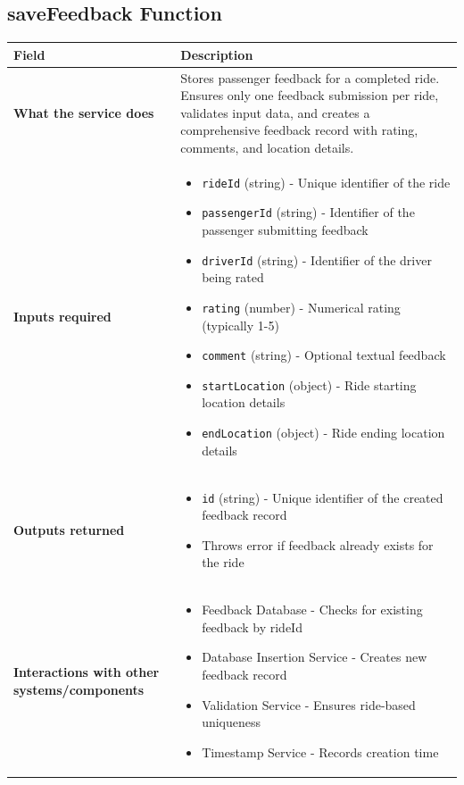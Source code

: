 \documentclass[11pt,a4paper]{article}
\begin{document}
\subsection{saveFeedback Function}

\begin{longtable}{|p{3cm}|p{12cm}|}
\hline
\textbf{Field} & \textbf{Description} \\
\hline
\textbf{What the service does} & 
Stores passenger feedback for a completed ride. Ensures only one feedback submission per ride, validates input data, and creates a comprehensive feedback record with rating, comments, and location details. \\
\hline
\textbf{Inputs required} & 
\begin{itemize}[nosep]
\item \texttt{rideId} (string) - Unique identifier of the ride
\item \texttt{passengerId} (string) - Identifier of the passenger submitting feedback
\item \texttt{driverId} (string) - Identifier of the driver being rated
\item \texttt{rating} (number) - Numerical rating (typically 1-5)
\item \texttt{comment} (string) - Optional textual feedback
\item \texttt{startLocation} (object) - Ride starting location details
\item \texttt{endLocation} (object) - Ride ending location details
\end{itemize} \\
\hline
\textbf{Outputs returned} & 
\begin{itemize}[nosep]
\item \texttt{id} (string) - Unique identifier of the created feedback record
\item Throws error if feedback already exists for the ride
\end{itemize} \\
\hline
\textbf{Interactions with other systems/components} & 
\begin{itemize}[nosep]
\item Feedback Database - Checks for existing feedback by rideId
\item Database Insertion Service - Creates new feedback record
\item Validation Service - Ensures ride-based uniqueness
\item Timestamp Service - Records creation time
\end{itemize} \\

\end{longtable}
\end{document}
